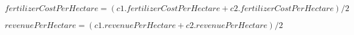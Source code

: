 \documentclass{article}
\begin{document}
$ fertilizerCostPerHectare = (c1.fertilizerCostPerHectare + c2.fertilizerCostPerHectare) / 2 $
\pagebreak

$ revenuePerHectare = (c1.revenuePerHectare + c2.revenuePerHectare) / 2 $
\pagebreak
\end{document}
